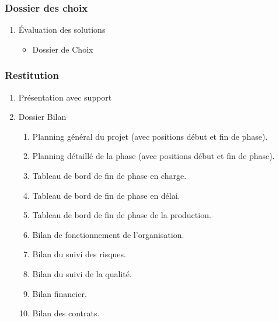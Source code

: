 \subsubsection{Dossier des choix}
		\begin{enumerate}
			\item Évaluation des solutions
				\begin{itemize}
					\item Dossier de Choix
				\end{itemize}
		\end{enumerate}

\subsubsection{Restitution}
		\begin{enumerate}
			\item Présentation avec support 
			\item Dossier Bilan
				\begin{enumerate}
					\item Planning général du projet
                        (avec positions début et fin de phase).
					\item Planning détaillé de la phase
                        (avec positions début et fin de phase).
					\item Tableau de bord de fin de phase en charge.
					\item Tableau de bord de fin de phase en délai.
					\item Tableau de bord de fin de phase de la production.
					\item Bilan de fonctionnement de l'organisation.
					\item Bilan du suivi des risques.
					\item Bilan du suivi de la qualité.
					\item Bilan financier.
					\item Bilan des contrats.
				\end{enumerate}
		\end{enumerate}
				

